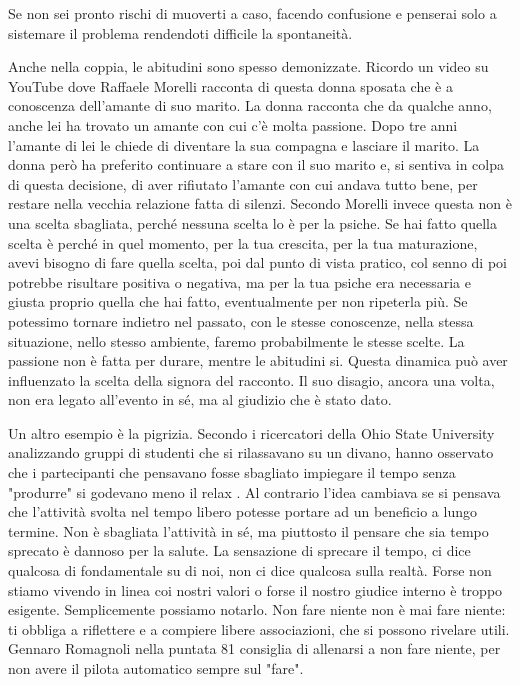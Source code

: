 \documentclass[12pt]{book} %
\begin{document}
\begin{mdframed}[linewidth=1pt]
Se non sei pronto rischi di muoverti a caso, facendo confusione e penserai solo a sistemare il problema rendendoti difficile la spontaneità.

Anche nella coppia, le abitudini sono spesso demonizzate. Ricordo un video su YouTube dove Raffaele Morelli racconta di
questa donna sposata che è a conoscenza dell'amante di suo marito. La donna racconta che da
qualche anno, anche lei ha trovato un amante con cui c'è molta passione. Dopo tre anni l'amante di lei le
chiede di diventare la sua compagna e lasciare il marito. La donna però ha preferito continuare a stare con il suo
marito e, si sentiva in colpa di questa decisione, di aver rifiutato l'amante con cui andava tutto
bene, per restare nella vecchia relazione fatta di silenzi. Secondo Morelli invece questa non è una scelta sbagliata,
perché nessuna scelta lo è per la psiche. Se hai fatto quella scelta è perché in quel momento, per la tua crescita, per
la tua maturazione, avevi bisogno di fare quella scelta, poi dal punto di vista pratico, col senno di poi potrebbe
risultare positiva o negativa, ma per la tua psiche era necessaria e giusta proprio quella che hai fatto, eventualmente
per non ripeterla più. Se potessimo tornare indietro nel
passato, con le stesse conoscenze, nella stessa situazione, nello stesso ambiente, faremo probabilmente le stesse scelte.
La passione non è fatta per durare, mentre le abitudini si. Questa dinamica può aver influenzato la scelta della signora del racconto.
Il suo disagio, ancora una volta, non era legato all'evento in sé, ma al giudizio che è stato dato.

Un altro esempio è la pigrizia. Secondo i ricercatori della Ohio State University analizzando gruppi di studenti che si
rilassavano su un divano, hanno osservato che i partecipanti che pensavano fosse sbagliato impiegare il tempo senza
"produrre" si godevano meno il relax . Al contrario l'idea cambiava se
si pensava che l'attività svolta nel tempo libero potesse portare ad un beneficio a lungo termine. Non è sbagliata
l'attività in sé, ma piuttosto il pensare che sia tempo sprecato è dannoso per la salute. La sensazione
di sprecare il tempo, ci dice qualcosa di fondamentale su di noi, non ci dice qualcosa sulla realtà. Forse non stiamo
vivendo in linea coi nostri valori o forse il nostro giudice interno è troppo esigente. Semplicemente possiamo notarlo. Non
fare niente non è mai fare niente: ti obbliga a riflettere e a compiere libere associazioni, che si possono rivelare
utili. Gennaro Romagnoli nella puntata 81 consiglia di allenarsi a non fare niente, per non avere il pilota automatico sempre sul "fare".
\end{mdframed}
\end{document}
